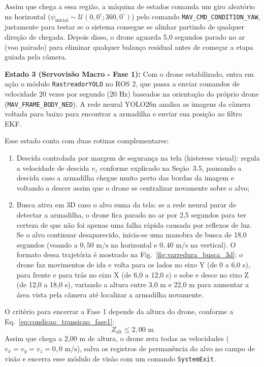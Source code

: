 Assim que chega a essa região, a máquina de estados comanda um giro aleatório na horizontal ($\psi_{\text{inicial}} \sim \mathcal{U}(0{,}0^\circ; 360{,}0^\circ)$) pelo comando \texttt{MAV\_CMD\_CONDITION\_YAW}, justamente para testar se o sistema consegue se alinhar partindo de qualquer direção de chegada. Depois disso, o drone aguarda 5,0 segundos parado no ar (voo pairado) para eliminar qualquer balanço residual antes de começar a etapa guiada pela câmera.

\textbf{Estado 3 (Servovisão Macro - Fase 1):} Com o drone estabilizado, entra em ação o módulo \texttt{RastreadorYOLO} no ROS 2, que passa a enviar comandos de velocidade 20 vezes por segundo (20 Hz) baseados na orientação do próprio drone (\texttt{MAV\_FRAME\_BODY\_NED}). A rede neural YOLO26n analisa as imagens da câmera voltada para baixo para encontrar a armadilha e enviar sua posição ao filtro EKF.

Esse estado conta com duas rotinas complementares:
\begin{enumerate}
	\item Descida controlada por margem de segurança na tela (histerese visual): regula a velocidade de descida $v_z$ conforme explicado na Seção~3.5, pausando a descida caso a armadilha chegue muito perto das bordas da imagem e voltando a descer assim que o drone se centralizar novamente sobre o alvo;
	\item Busca ativa em 3D caso o alvo suma da tela: se a rede neural parar de detectar a armadilha, o drone fica parado no ar por 2,5 segundos para ter certeza de que não foi apenas uma falha rápida causada por reflexos de luz. Se o alvo continuar desaparecido, inicia-se uma manobra de busca de 18,0 segundos (voando a $0{,}50\text{ m/s}$ na horizontal e $0{,}40\text{ m/s}$ na vertical). O formato dessa trajetória é mostrado na Fig.~\ref{fig:varredura_busca_3d}: o drone faz movimentos de ida e volta para os lados no eixo Y (de 0 a 6,0 s), para frente e para trás no eixo X (de 6,0 a 12,0 s) e sobe e desce no eixo Z (de 12,0 a 18,0 s), variando a altura entre 3,0 m e 22,0 m para aumentar a área vista pela câmera até localizar a armadilha novamente.
\end{enumerate}

O critério para encerrar a Fase 1 depende da altura do drone, conforme a Eq.~\ref{eq:condicao_transicao_fase1}:
\begin{equation}
	Z_{\text{alt}} \le 2{,}00\text{ m}
	\label{eq:condicao_transicao_fase1}
\end{equation}
Assim que chega a 2,00 m de altura, o drone zera todas as velocidades ($v_x = v_y = v_z = 0{,}0\text{ m/s}$), salva os registros de permanência do alvo no campo de visão e encerra esse módulo de visão com um comando \texttt{SystemExit}.

